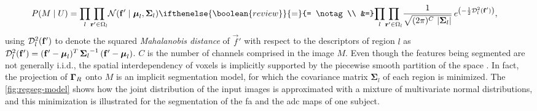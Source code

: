   \begin{align}
  P( M \mid U) &= \underset{l}{\prod} \underset{\vec{r}' \in \Omega_l}{\prod}
  \mathcal{N} (\vec{f}' \mid \boldsymbol{\mu}_l, \boldsymbol{\Sigma}_{l} )
  \ifthenelse{\boolean{review}}{=}{= \notag\\ &=}
  \underset{l}{\prod} \underset{\vec{r}' \in \Omega_l}{\prod} \frac{1}{ \sqrt{(2\pi)^{C}\,\left|\boldsymbol{\Sigma}_{l}\right|}}\,{e^{\left(-\frac{1}{2}
  \mdist{f'}{l} \right)}},
  \label{eq:regseg-pdf}
  \end{align}%
  using $\mdist{f'}{l}$ to denote the squared \emph{Mahalanobis distance} of $\vec{f}'$ with respect
  to the descriptors of region $l$ as
  $\mdist{f'}{l} = (\vec{f}' - \boldsymbol{\mu}_l)^T \, {\boldsymbol{\Sigma}_l}^{-1} \, (\vec{f}' - \boldsymbol{\mu}_l)$.
$C$ is the number of channels comprised in the image $M$.
Even though the features being segmented are not generally i.i.d., the 
  spatial interdependency of voxels is implicitly supported by the piecewise smooth
  partition of the space \omegaset{}.
In fact, the projection of $\gammaset_R$ onto $M$ is an implicit segmentation model, for which
  the covariance matrix $\boldsymbol{\Sigma}_l$ of each region is minimized.
The \autoref{fig:regseg-model} shows how the joint distribution of 
  the input images is approximated with a mixture of multivariate normal distributions,
  and this minimization is illustrated for the segmentation of the \gls*{fa} and the \gls*{adc} maps
  of one subject.

